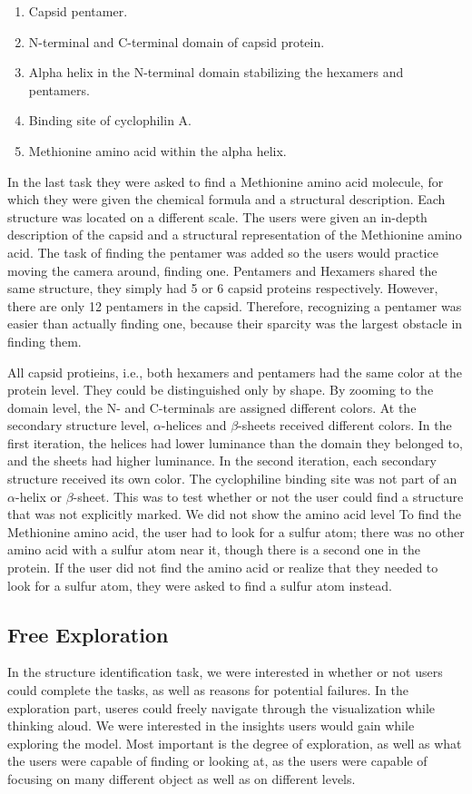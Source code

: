 \documentclass[review,journal]{vgtc}         %
\begin{document}
\begin{enumerate}
	\item Capsid pentamer.
	\item N-terminal and C-terminal domain of capsid protein.
	\item Alpha helix in the N-terminal domain stabilizing the hexamers and pentamers.
	\item Binding site of cyclophilin A.
	\item Methionine amino acid within the alpha helix.
\end{enumerate}

In the last task they were asked to find a Methionine amino acid molecule, for which they were given the chemical formula and a structural description.
Each structure was located on a different scale. 
The users were given an in-depth description of the capsid and a structural representation of the Methionine amino acid. 
The task of finding the pentamer was added so the users would practice moving the camera around,  finding one. 
Pentamers and Hexamers shared the same structure, they simply had 5 or 6 capsid proteins respectively. 
However, there are only 12 pentamers in the capsid.
Therefore, recognizing a pentamer was easier than actually finding one, because their sparcity was the largest obstacle in finding them.

All capsid protieins, i.e., both hexamers and pentamers had the same color at the protein level. They could be distinguished only by shape. By zooming to the domain level, the N- and C-terminals are assigned different colors. At the secondary structure level, $\alpha$-helices and $\beta$-sheets received different colors. In the first iteration, the helices had lower luminance than the domain they belonged to, and the sheets had higher luminance. In the second iteration, each secondary structure received its own color. 
The cyclophiline binding site was not part of an $\alpha$-helix or $\beta$-sheet.
This was to test whether or not the user could find a structure that was not explicitly marked. 
We did not show the amino acid level
To find the Methionine amino acid, the user had to look for a sulfur atom; there was no other amino acid with a sulfur atom near it, though there is a second one in the protein. 
If the user did not find the amino acid or realize that they needed to look for a sulfur atom, they were asked to find a sulfur atom instead.





\subsection{Free Exploration}
In the structure identification task, we were interested in whether or not users could complete the tasks, as well as reasons for potential failures. 
In the exploration part, useres could freely navigate through the visualization while thinking aloud. We were interested in the insights users would gain while exploring the model.
Most important is the degree of exploration, as well as what the users were capable of finding or looking at, as the users were capable of focusing on many different object as well as on different levels.
\end{document}
